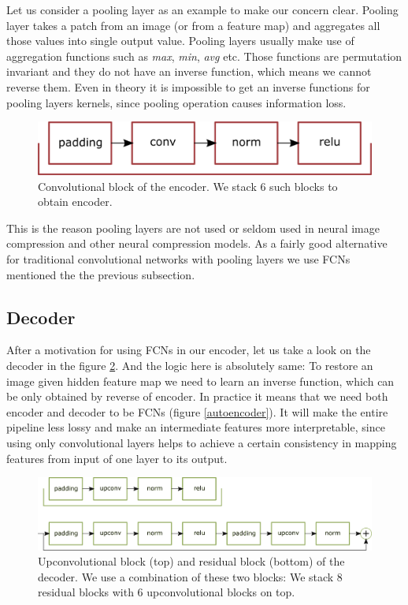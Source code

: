 Let us consider a pooling layer as an example to make our concern clear. Pooling layer takes a patch from an image (or from a feature map) and aggregates all those values into single output value. Pooling layers usually make use of aggregation functions such as \textit{max}, \textit{min}, \textit{avg} etc. Those functions are permutation invariant and they do not have an inverse function, which means we cannot reverse them. Even in theory it is impossible to get an inverse functions for pooling layers kernels, since pooling operation causes information loss.

\begin{figure}[!ht]
    \centering
    \includegraphics[width=\textwidth]{figure/encoder.png}
    \caption{Convolutional block of the encoder. We stack 6 such blocks to obtain encoder.}
    \label{encoder}
\end{figure}

This is the reason pooling layers are not used or seldom used in neural image compression and other neural compression models. As a fairly good alternative for traditional convolutional networks with pooling layers we use FCNs mentioned the the previous subsection.

\subsection{Decoder}

After a motivation for using FCNs in our encoder, let us take a look on the decoder in the figure \ref{decoder}. And the logic here is absolutely same: To restore an image given hidden feature map we need to learn an inverse function, which can be only obtained by reverse of encoder. In practice it means that we need both encoder and decoder to be FCNs (figure \ref{autoencoder}). It will make the entire pipeline less lossy and make an intermediate features more interpretable, since using only convolutional layers helps to achieve a certain consistency in mapping features from input of one layer to its output.

\begin{figure}[!ht]
    \centering
    \includegraphics[width=\textwidth]{figure/generator.png}
    \caption{Upconvolutional block (top) and residual block (bottom) of the decoder. We use a combination of these two blocks: We stack 8 residual blocks with 6 upconvolutional blocks on top.}
    \label{decoder}
\end{figure}

